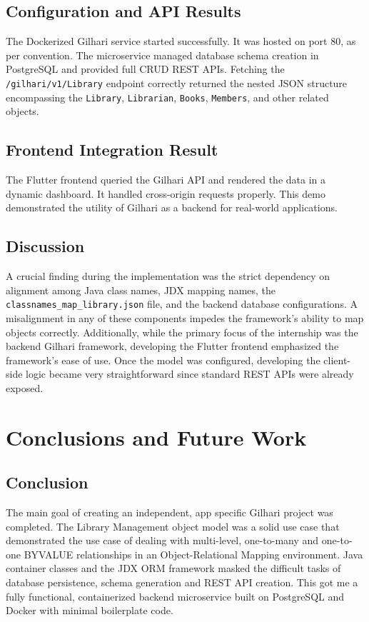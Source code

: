 \documentclass{book}
\begin{document}
\section{Configuration and API Results}
The Dockerized Gilhari service started successfully. It was hosted on port 80, as per convention. The microservice managed database schema creation in PostgreSQL and provided full CRUD REST APIs. 
Fetching the \texttt{/gilhari/v1/Library} endpoint correctly returned the nested JSON structure encompassing the \texttt{Library}, \texttt{Librarian}, \texttt{Books}, \texttt{Members}, and other related objects.

\section{Frontend Integration Result}
The Flutter frontend queried the Gilhari API and rendered the data in a dynamic dashboard. It handled cross-origin requests properly. This demo demonstrated the utility of Gilhari as a backend for real-world applications.

\section{Discussion}
A crucial finding during the implementation was the strict dependency on alignment among Java class names, JDX mapping names, the \texttt{classnames\_map\_library.json} file, and the backend database configurations. A misalignment in any of these components impedes the framework's ability to map objects correctly.
Additionally, while the primary focus of the internship was the backend Gilhari framework, developing the Flutter frontend emphasized the framework's ease of use. Once the model was configured, developing the client-side logic became very straightforward since standard REST APIs were already exposed.

\chapter{Conclusions and Future Work}

\section{Conclusion}
The main goal of creating an independent, app specific Gilhari project was completed. The Library Management object model was a solid use case that demonstrated the use case of dealing with multi-level, one-to-many and one-to-one BYVALUE relationships in an Object-Relational Mapping environment. Java container classes and the JDX ORM framework masked the difficult tasks of database persistence, schema generation and REST API creation. This got me a fully functional, containerized backend microservice built on PostgreSQL and Docker with minimal boilerplate code.
\end{document}
